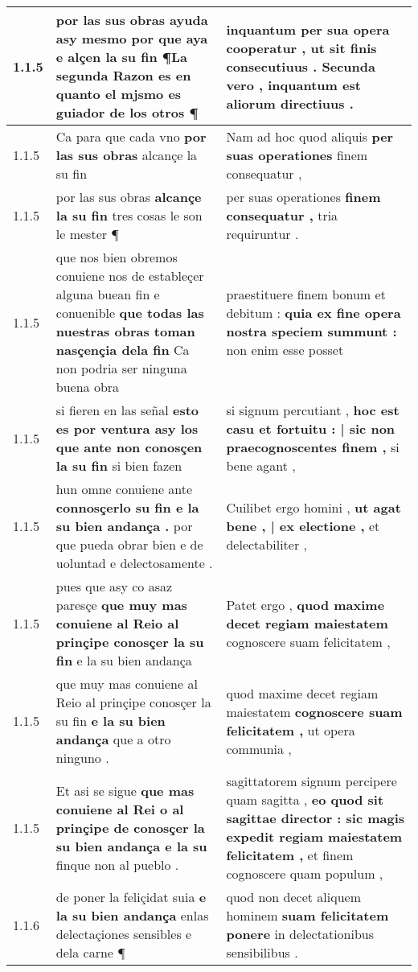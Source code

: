 \begin{tabular}{|p{1cm}|p{6.5cm}|p{6.5cm}|}
1.1.5 & por las sus obras ayuda asy mesmo \textbf{ por que aya e alçen la su fin } ¶La segunda Razon es en quanto el mjsmo es guiador de los otros ¶ & inquantum per sua opera cooperatur , \textbf{ ut sit finis consecutiuus . } Secunda vero , inquantum est aliorum directiuus . \\\hline
1.1.5 & Ca para que cada vno \textbf{ por las sus obras } alcançe la su fin & Nam ad hoc quod aliquis \textbf{ per suas operationes } finem consequatur , \\\hline
1.1.5 & por las sus obras \textbf{ alcançe la su fin } tres cosas le son le mester ¶ & per suas operationes \textbf{ finem consequatur , } tria requiruntur . \\\hline
1.1.5 & que nos bien obremos conuiene nos de estableçer alguna buean fin e conuenible \textbf{ que todas las nuestras obras toman nasçençia dela fin } Ca non podria ser ninguna buena obra & praestituere finem bonum et debitum : \textbf{ quia ex fine opera nostra speciem summunt : } non enim esse posset \\\hline
1.1.5 & si fieren en las señal \textbf{ esto es por ventura asy los que ante non conosçen la su fin } si bien fazen & si signum percutiant , \textbf{ hoc est casu et fortuitu : | sic non praecognoscentes finem , } si bene agant , \\\hline
1.1.5 & hun omne conuiene ante \textbf{ connosçerlo su fin e la su bien andança . } por que pueda obrar bien e de uoluntad e delectosamente . & Cuilibet ergo homini , \textbf{ ut agat bene , | ex electione , } et delectabiliter , \\\hline
1.1.5 & pues que asy co asaz paresçe \textbf{ que muy mas conuiene al Reio al prinçipe conosçer la su fin } e la su bien andança & Patet ergo , \textbf{ quod maxime decet regiam maiestatem } cognoscere suam felicitatem , \\\hline
1.1.5 & que muy mas conuiene al Reio al prinçipe conosçer la su fin \textbf{ e la su bien andança } que a otro ninguno . & quod maxime decet regiam maiestatem \textbf{ cognoscere suam felicitatem , } ut opera communia , \\\hline
1.1.5 & Et asi se sigue \textbf{ que mas conuiene al Rei o al prinçipe de conosçer la su bien andança e la su } finque non al pueblo . & sagittatorem signum percipere quam sagitta , \textbf{ eo quod sit sagittae director : sic magis expedit regiam maiestatem felicitatem , } et finem cognoscere quam populum , \\\hline
1.1.6 & de poner la feliçidat suia \textbf{ e la su bien andança } enlas delectaçiones sensibles e dela carne ¶ & quod non decet aliquem hominem \textbf{ suam felicitatem ponere } in delectationibus sensibilibus . \\\hline

\end{tabular}
